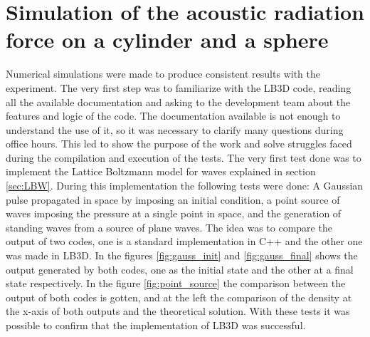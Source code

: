 \chapter{Simulation of the acoustic radiation force on a cylinder and a sphere}

Numerical simulations were made to produce consistent results with the experiment. The very first step was to familiarize with the LB3D code, reading all the available documentation and asking to the development team about the features and logic of the code. The documentation available is not enough to understand the use of it, so it was necessary to clarify many questions during office hours. This led to show the purpose of the work and solve struggles faced during the compilation and execution of the tests. The very first test done was to implement the Lattice Boltzmann model for waves explained in section \ref{sec:LBW}. During this implementation the following tests were done: A Gaussian pulse propagated in space by imposing an initial condition, a point source of waves imposing the pressure at a single point in space, and the generation of standing waves from a source of plane waves. The idea was to compare the output of two codes, one is a standard implementation in C++ and the other one was made in LB3D. In the figures \ref{fig:gauss_init} and \ref{fig:gauss_final} shows the output generated by both codes, one as the initial state and the other at a final state respectively. In the figure \ref{fig:point_source} the comparison between the output of both codes is gotten, and at the left the comparison of the density at the x-axis of both outputs and the theoretical solution. With these tests it was possible to confirm that the implementation of LB3D was successful. 

